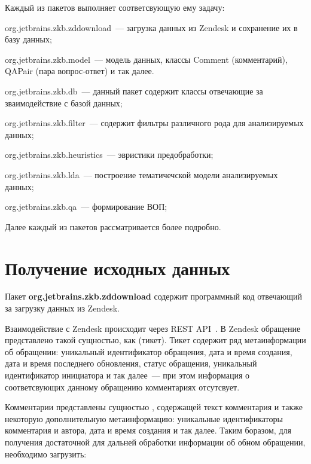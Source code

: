 Каждый из пакетов выполняет соответсвующую ему задачу:

\begin{itemize*}
\item org.jetbrains.zkb.zddownload~--- загрузка данных из Zendesk и сохранение их в базу данных;
\item org.jetbrains.zkb.model~--- модель данных, классы Comment (комментарий), QAPair (пара вопрос-ответ) и так далее.
\item org.jetbrains.zkb.db~--- данный пакет содержит классы отвечающие за зваимодействие с базой данных;
\item org.jetbrains.zkb.filter~--- содержит фильтры различного рода для анализируемых данных;
\item org.jetbrains.zkb.heuristics~--- эвристики предобработки;
\item org.jetbrains.zkb.lda~--- построение тематичечской модели анализируемых данных;
\item org.jetbrains.zkb.qa~--- формирование ВОП;

\end{itemize*}

Далее каждый из пакетов рассматривается более подробно.

\section{Получение исходных данных}
\label{sec:zddwn}

Пакет \textbf{org.jetbrains.zkb.zddownload} содержит программный код отвечающий за загрузку данных из Zendesk.

Взаимодействие с Zendesk происходит через REST API~\cite{zdapi}. В Zendesk обращение представлено такой сущностью, как  (тикет). Тикет содержит ряд метаинформации об обращении: уникальный идентификатор обращения, дата и время создания, дата и время последнего обновления, статус обращения, уникальный идентификатор инициатора и так далее~--- при этом информация о соответсвующих данному обращению комментариях отсутсвует.


Комментарии представлены сущностью , содержащей текст комментария и также некоторую дополнительную метаинформацию: уникальные идентификаторы комментария и автора, дата и время создания и так далее. Таким боразом, для получения достаточной для дальней обработки информации об обном обращении, необходимо загрузить:

